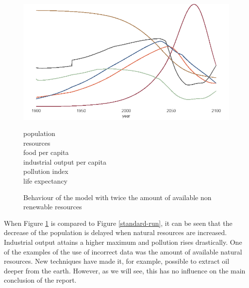 \documentclass[10pt,a4paper]{scrartcl}
\begin{document}
\begin{figure}
\centering
\begin{minipage}{0.79\textwidth}
\includegraphics[width=\textwidth]{./plaatjes/multiplier-2.png}
\end{minipage}
\begin{minipage}{0.2\textwidth}
\textcolor[HTML]{e07154}{population}\\
\textcolor[HTML]{b0875e}{resources}\\
\textcolor[HTML]{a8c3a5}{food per capita}\\
\textcolor[HTML]{4a6892}{industrial output per capita}\\
\textcolor[HTML]{a25563}{pollution index}\\
\textcolor[HTML]{666666}{life expectancy}\\
\end{minipage}
\caption{Behaviour of the model with twice the amount of available non renewable resources}
\label{resources-2}
\end{figure}

When Figure \ref{resources-2} is compared to Figure \ref{standard-run}, it can be seen that the decrease of the population is delayed when natural resources are increased. Industrial output attains a higher maximum and pollution rises drastically. One of the examples of the use of incorrect data was the amount of available natural resources. New techniques have made it, for example, possible to extract oil deeper from the earth. However, as we will see, this has no influence on the main conclusion of the report.
\end{document}
